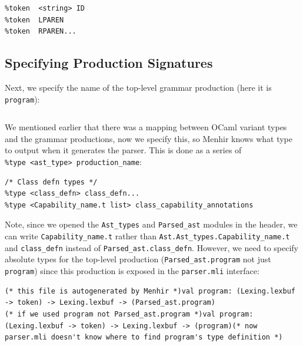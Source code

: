 \begin{lstlisting}[caption={parser.mly}]
%token  <int> INT
%token  <string> ID
%token  LPAREN
%token  RPAREN...
\end{lstlisting}

\hypertarget{specifying-production-signatures}{%
\subsection{\texorpdfstring{\protect\hyperlink{specifying-production-signatures}{}Specifying
Production
Signatures}{Specifying Production Signatures}}\label{specifying-production-signatures}}

Next, we specify the name of the top-level grammar production (here it
is \texttt{program}):

%

\begin{lstlisting}[caption={{parser.mly}}]
%start program
\end{lstlisting}

We mentioned earlier that there was a mapping between OCaml variant
types and the grammar productions, now we specify this, so Menhir knows
what type to output when it generates the parser. This is done as a
series of
\texttt{\%type\ \textless{}ast\_type\textgreater{}\ production\_name}:

%

\begin{lstlisting}[caption={{parser.mly}}]
%type <Parsed_ast.program> program
/* Class defn types */
%type <class_defn> class_defn...
%type <Capability_name.t list> class_capability_annotations
\end{lstlisting}

Note, since we opened the \texttt{Ast\_types} and \texttt{Parsed\_ast}
modules in the header, we can write \texttt{Capability\_name.t} rather
than \texttt{Ast.Ast\_types.Capability\_name.t} and \texttt{class\_defn}
instead of \texttt{Parsed\_ast.class\_defn}. However, we need to specify
absolute types for the top-level production
(\texttt{Parsed\_ast.program} not just \texttt{program}) since this
production is exposed in the \texttt{parser.mli} interface:

\begin{lstlisting}[language=caml,caption={parser.mli}]
(* this file is autogenerated by Menhir *)val program: (Lexing.lexbuf -> token) -> Lexing.lexbuf -> (Parsed_ast.program)
(* if we used program not Parsed_ast.program *)val program: (Lexing.lexbuf -> token) -> Lexing.lexbuf -> (program)(* now parser.mli doesn't know where to find program's type definition *)
\end{lstlisting}

